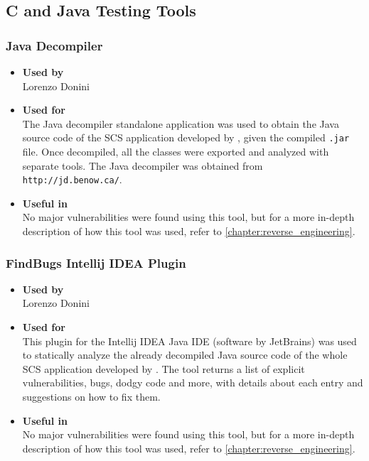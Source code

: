 \subsection*{C and Java Testing Tools}

\subsubsection*{Java Decompiler}
\begin{itemize}
	\item \textbf{Used by}\\ Lorenzo Donini
	\item \textbf{Used for}\\ The Java decompiler standalone application was used to obtain the Java source code of the SCS application developed by \bs, given the compiled \texttt{.jar} file. Once decompiled, all the classes were exported and analyzed with separate tools. The Java decompiler was obtained from \texttt{http://jd.benow.ca/}.
	\item \textbf{Useful in}\\ No major vulnerabilities were found using this tool, but for a more in-depth description of how this tool was used, refer to \ref{chapter:reverse_engineering}.
\end{itemize}

\subsubsection*{FindBugs Intellij IDEA Plugin}
\begin{itemize}
	\item \textbf{Used by}\\ Lorenzo Donini
	\item \textbf{Used for}\\ This plugin for the Intellij IDEA Java IDE (software by JetBrains) was used to statically analyze the already decompiled Java source code of the whole SCS application developed by \bs. The tool returns a list of explicit vulnerabilities, bugs, dodgy code and more, with details about each entry and suggestions on how to fix them.
	\item \textbf{Useful in}\\ No major vulnerabilities were found using this tool, but for a more in-depth  description of how this tool was used, refer to \ref{chapter:reverse_engineering}.
\end{itemize}

